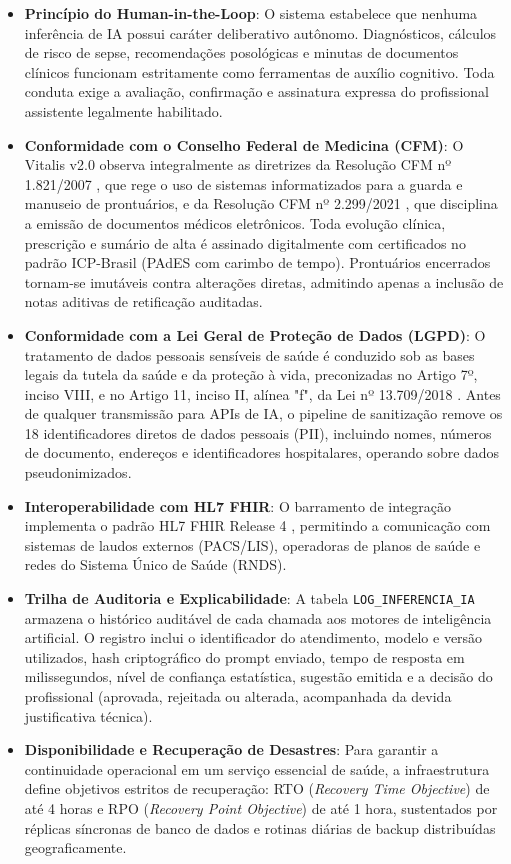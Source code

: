 \begin{itemize}
    \item \textbf{Princípio do Human-in-the-Loop}: O sistema estabelece que nenhuma inferência de IA possui caráter deliberativo autônomo. Diagnósticos, cálculos de risco de sepse, recomendações posológicas e minutas de documentos clínicos funcionam estritamente como ferramentas de auxílio cognitivo. Toda conduta exige a avaliação, confirmação e assinatura expressa do profissional assistente legalmente habilitado.
    \item \textbf{Conformidade com o Conselho Federal de Medicina (CFM)}: O Vitalis v2.0 observa integralmente as diretrizes da Resolução CFM nº 1.821/2007 \cite{cfm_prontuario:2007}, que rege o uso de sistemas informatizados para a guarda e manuseio de prontuários, e da Resolução CFM nº 2.299/2021 \cite{cfm_digital:2021}, que disciplina a emissão de documentos médicos eletrônicos. Toda evolução clínica, prescrição e sumário de alta é assinado digitalmente com certificados no padrão ICP-Brasil (PAdES com carimbo de tempo). Prontuários encerrados tornam-se imutáveis contra alterações diretas, admitindo apenas a inclusão de notas aditivas de retificação auditadas.
    \item \textbf{Conformidade com a Lei Geral de Proteção de Dados (LGPD)}: O tratamento de dados pessoais sensíveis de saúde é conduzido sob as bases legais da tutela da saúde e da proteção à vida, preconizadas no Artigo 7º, inciso VIII, e no Artigo 11, inciso II, alínea "f", da Lei nº 13.709/2018 \cite{brasil_lgpd:2018}. Antes de qualquer transmissão para APIs de IA, o pipeline de sanitização remove os 18 identificadores diretos de dados pessoais (PII), incluindo nomes, números de documento, endereços e identificadores hospitalares, operando sobre dados pseudonimizados.
    \item \textbf{Interoperabilidade com HL7 FHIR}: O barramento de integração implementa o padrão HL7 FHIR Release 4 \cite{hl7_fhir:2019}, permitindo a comunicação com sistemas de laudos externos (PACS/LIS), operadoras de planos de saúde e redes do Sistema Único de Saúde (RNDS).
    \item \textbf{Trilha de Auditoria e Explicabilidade}: A tabela \texttt{LOG\_INFERENCIA\_IA} armazena o histórico auditável de cada chamada aos motores de inteligência artificial. O registro inclui o identificador do atendimento, modelo e versão utilizados, hash criptográfico do prompt enviado, tempo de resposta em milissegundos, nível de confiança estatística, sugestão emitida e a decisão do profissional (aprovada, rejeitada ou alterada, acompanhada da devida justificativa técnica).
    \item \textbf{Disponibilidade e Recuperação de Desastres}: Para garantir a continuidade operacional em um serviço essencial de saúde, a infraestrutura define objetivos estritos de recuperação: RTO (\textit{Recovery Time Objective}) de até 4 horas e RPO (\textit{Recovery Point Objective}) de até 1 hora, sustentados por réplicas síncronas de banco de dados e rotinas diárias de backup distribuídas geograficamente.
\end{itemize}
